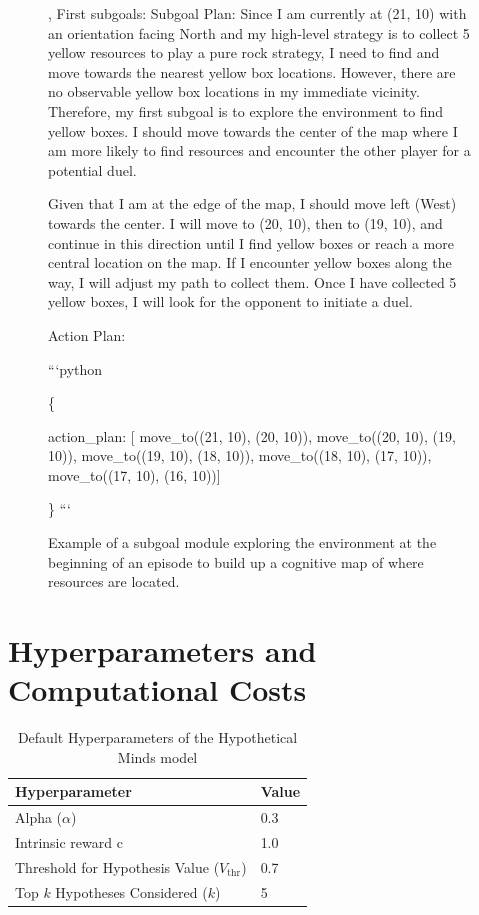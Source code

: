 \documentclass{article} %
\begin{document}
\begin{figure}[H]
\centering
\begin{tcolorbox}[
title={\small \textbf{Example of a successful embodied exploration at the beginning of an episode}},
width=0.99\columnwidth]
\fontsize{7pt}{7pt}\selectfont
\ttfamily,
First subgoals: Subgoal Plan:
Since I am currently at (21, 10) with an orientation facing North and my high-level strategy is to collect 5 yellow resources to play a pure rock strategy, I need to find and move towards the nearest yellow box locations. However, there are no observable yellow box locations in my immediate vicinity. Therefore, my first subgoal is to explore the environment to 
find yellow boxes. I should move towards the center of the map where I am more likely to find resources and encounter the other player for a 
potential duel.
\vspace{2mm}

Given that I am at the edge of the map, I should move left (West) towards the center. I will move to (20, 10), then to (19, 10), and continue in 
this direction until I find yellow boxes or reach a more central location on the map. If I encounter yellow boxes along the way, I will adjust my 
path to collect them. Once I have collected 5 yellow boxes, I will look 
for the opponent to initiate a duel.

Action Plan:

```python

\{


  action\_plan: [
    move\_to((21, 10), (20, 10)),
    move\_to((20, 10), (19, 10)),
    move\_to((19, 10), (18, 10)),
    move\_to((18, 10), (17, 10)),
    move\_to((17, 10), (16, 10))]
  
\}
```
\end{tcolorbox}
\caption{
Example of a subgoal module exploring the environment at the beginning of an episode to build up a cognitive map of where resources are located. 
}
\vspace{-4mm}
\label{fig:fig10}
\end{figure}

\section{Hyperparameters and Computational Costs}

\begin{table}[ht]
\centering
\begin{tabular}{|l|l|}
\hline
\textbf{Hyperparameter} & \textbf{Value} \\ \hline
Alpha ($\alpha$) & 0.3 \\ \hline
Intrinsic reward c & 1.0 \\ \hline
Threshold for Hypothesis Value ($V_{\text{thr}}$) & 0.7 \\ \hline
Top $k$ Hypotheses Considered ($k$) & 5 \\ \hline
\end{tabular}
\caption{Default Hyperparameters of the Hypothetical Minds model}
\label{table:hyperparameters}
\end{table}
\end{document}
